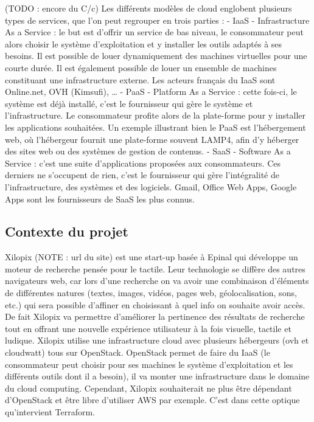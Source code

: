 \documentclass[]{article}
\begin{document}
(TODO : encore du C/c) Les différents modèles de cloud englobent
plusieurs types de services, que l'on peut regrouper en trois parties :
- IaaS - Infrastructure As a Service : le but est d'offrir un service de
bas niveau, le consommateur peut alors choisir le système d'exploitation
et y installer les outils adaptés à ses besoins. Il est possible de
louer dynamiquement des machines virtuelles pour une courte durée. Il
est également possible de louer un ensemble de machines constituant une
infrastructure externe. Les acteurs français du IaaS sont Online.net,
OVH (Kimsufi), \ldots{} - PaaS - Platform As a Service : cette fois-ci,
le système est déjà installé, c'est le fournisseur qui gère le système
et l'infrastructure. Le consommateur profite alors de la plate-forme
pour y installer les applications souhaitées. Un exemple illustrant bien
le PaaS est l'hébergement web, où l'hébergeur fournit une plate-forme
souvent LAMP4, afin d'y héberger des sites web ou des systèmes de
gestion de contenus. - SaaS - Software As a Service : c'est une suite
d'applications proposées aux consommateurs. Ces derniers ne s'occupent
de rien, c'est le fournisseur qui gère l'intégralité de
l'infrastructure, des systèmes et des logiciels. Gmail, Office Web Apps,
Google Apps sont les fournisseurs de SaaS les plus connus.

\subsection{Contexte du projet}\label{contexte-du-projet}

Xilopix (NOTE : url du site) est une start-up basée à Epinal qui
développe un moteur de recherche pensée pour le tactile. Leur
technologie se diffère des autres navigateurs web, car lors d'une
recherche on va avoir une combinaison d'éléments de différentes natures
(textes, images, vidéos, pages web, géolocalisation, sons, etc.) qui
sera possible d'affiner en choisissant à quel info on souhaite avoir
accès. De fait Xilopix va permettre d'améliorer la pertinence des
résultats de recherche tout en offrant une nouvelle expérience
utilisateur à la fois visuelle, tactile et ludique. Xilopix utilise une
infrastructure cloud avec plusieurs hébergeurs (ovh et cloudwatt) tous
sur OpenStack. OpenStack permet de faire du IaaS (le consommateur peut
choisir pour ses machines le système d'exploitation et les différents
outils dont il a besoin), il va monter une infrastructure dans le
domaine du cloud computing. Cependant, Xilopix souhaiterait ne plus être
dépendant d'OpenStack et être libre d'utiliser AWS par exemple. C'est
dans cette optique qu'intervient Terraform.
\end{document}
